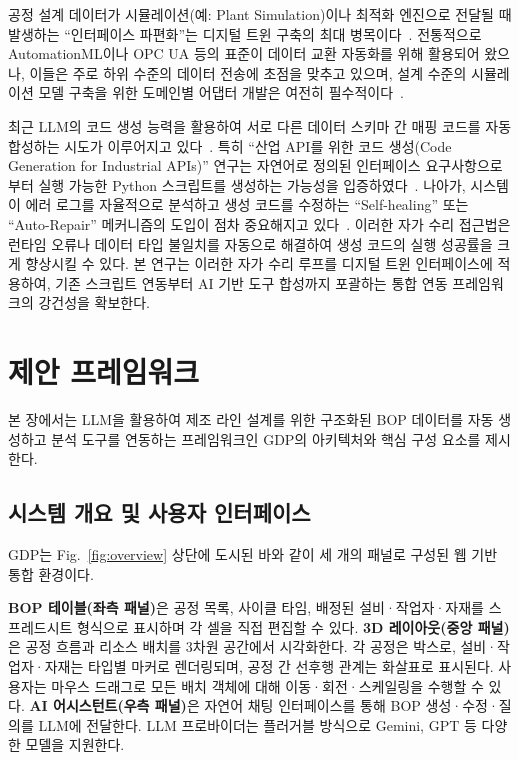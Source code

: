 공정 설계 데이터가 시뮬레이션(예: Plant Simulation)이나 최적화 엔진으로 전달될 때 발생하는 ``인터페이스 파편화''는 디지털 트윈 구축의 최대 병목이다~\cite{b10}. 전통적으로 AutomationML이나 OPC UA 등의 표준이 데이터 교환 자동화를 위해 활용되어 왔으나, 이들은 주로 하위 수준의 데이터 전송에 초점을 맞추고 있으며, 설계 수준의 시뮬레이션 모델 구축을 위한 도메인별 어댑터 개발은 여전히 필수적이다~\cite{b11}.

최근 LLM의 코드 생성 능력을 활용하여 서로 다른 데이터 스키마 간 매핑 코드를 자동 합성하는 시도가 이루어지고 있다~\cite{b12}. 특히 ``산업 API를 위한 코드 생성(Code Generation for Industrial APIs)'' 연구는 자연어로 정의된 인터페이스 요구사항으로부터 실행 가능한 Python 스크립트를 생성하는 가능성을 입증하였다~\cite{b13}. 나아가, 시스템이 에러 로그를 자율적으로 분석하고 생성 코드를 수정하는 ``Self-healing'' 또는 ``Auto-Repair'' 메커니즘의 도입이 점차 중요해지고 있다~\cite{b14}. 이러한 자가 수리 접근법은 런타임 오류나 데이터 타입 불일치를 자동으로 해결하여 생성 코드의 실행 성공률을 크게 향상시킬 수 있다. 본 연구는 이러한 자가 수리 루프를 디지털 트윈 인터페이스에 적용하여, 기존 스크립트 연동부터 AI 기반 도구 합성까지 포괄하는 통합 연동 프레임워크의 강건성을 확보한다.

\section{제안 프레임워크}
\label{sec:framework}

본 장에서는 LLM을 활용하여 제조 라인 설계를 위한 구조화된 BOP 데이터를 자동 생성하고 분석 도구를 연동하는 프레임워크인 GDP의 아키텍처와 핵심 구성 요소를 제시한다.

\subsection{시스템 개요 및 사용자 인터페이스}

GDP는 Fig.~\ref{fig:overview} 상단에 도시된 바와 같이 세 개의 패널로 구성된 웹 기반 통합 환경이다.

\textbf{BOP 테이블(좌측 패널)}은 공정 목록, 사이클 타임, 배정된 설비·작업자·자재를 스프레드시트 형식으로 표시하며 각 셀을 직접 편집할 수 있다. \textbf{3D 레이아웃(중앙 패널)}은 공정 흐름과 리소스 배치를 3차원 공간에서 시각화한다. 각 공정은 박스로, 설비·작업자·자재는 타입별 마커로 렌더링되며, 공정 간 선후행 관계는 화살표로 표시된다. 사용자는 마우스 드래그로 모든 배치 객체에 대해 이동·회전·스케일링을 수행할 수 있다. \textbf{AI 어시스턴트(우측 패널)}은 자연어 채팅 인터페이스를 통해 BOP 생성·수정·질의를 LLM에 전달한다. LLM 프로바이더는 플러거블 방식으로 Gemini, GPT 등 다양한 모델을 지원한다.

